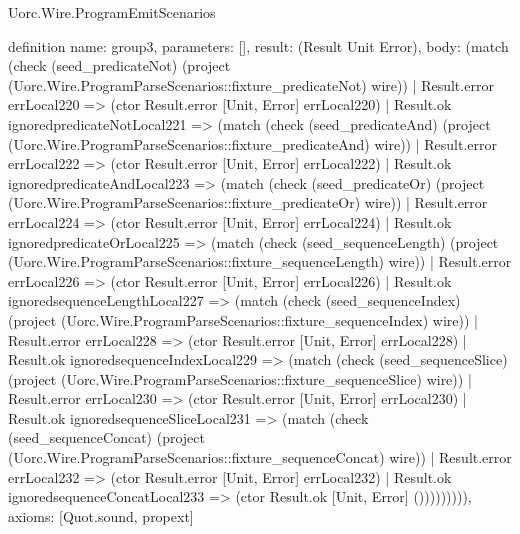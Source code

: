 \begin{lexlean}{Uorc.Wire.ProgramEmitScenarios}
\begin{semanticmodule}
definition{
  name: group3,
  parameters: [],
  result: (Result Unit Error),
  body: (match (check (seed_predicateNot) (project (Uorc.Wire.ProgramParseScenarios::fixture_predicateNot) wire))
    | Result.error errLocal220 => (ctor Result.error [Unit, Error] errLocal220)
    | Result.ok ignoredpredicateNotLocal221 => (match (check (seed_predicateAnd) (project (Uorc.Wire.ProgramParseScenarios::fixture_predicateAnd) wire))
      | Result.error errLocal222 => (ctor Result.error [Unit, Error] errLocal222)
      | Result.ok ignoredpredicateAndLocal223 => (match (check (seed_predicateOr) (project (Uorc.Wire.ProgramParseScenarios::fixture_predicateOr) wire))
        | Result.error errLocal224 => (ctor Result.error [Unit, Error] errLocal224)
        | Result.ok ignoredpredicateOrLocal225 => (match (check (seed_sequenceLength) (project (Uorc.Wire.ProgramParseScenarios::fixture_sequenceLength) wire))
          | Result.error errLocal226 => (ctor Result.error [Unit, Error] errLocal226)
          | Result.ok ignoredsequenceLengthLocal227 => (match (check (seed_sequenceIndex) (project (Uorc.Wire.ProgramParseScenarios::fixture_sequenceIndex) wire))
            | Result.error errLocal228 => (ctor Result.error [Unit, Error] errLocal228)
            | Result.ok ignoredsequenceIndexLocal229 => (match (check (seed_sequenceSlice) (project (Uorc.Wire.ProgramParseScenarios::fixture_sequenceSlice) wire))
              | Result.error errLocal230 => (ctor Result.error [Unit, Error] errLocal230)
              | Result.ok ignoredsequenceSliceLocal231 => (match (check (seed_sequenceConcat) (project (Uorc.Wire.ProgramParseScenarios::fixture_sequenceConcat) wire))
                | Result.error errLocal232 => (ctor Result.error [Unit, Error] errLocal232)
                | Result.ok ignoredsequenceConcatLocal233 => (ctor Result.ok [Unit, Error] ())))))))),
  axioms: [Quot.sound, propext]
}


\end{semanticmodule}
\end{lexlean}
